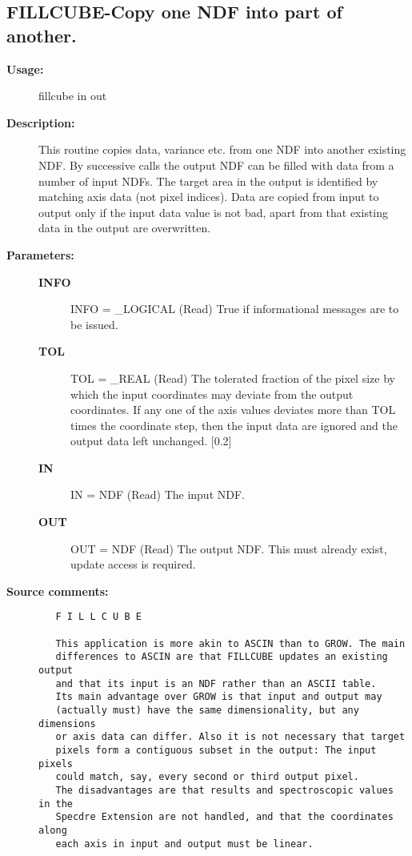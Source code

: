 \subsection{FILLCUBE-\label{FILLCUBE}Copy one NDF into part of another.}
\begin{description}

\item [{\bf Usage:}]

   fillcube in out


\item [{\bf Description:}]
   This routine copies data, variance etc. from one NDF into another
   existing NDF. By successive calls the output NDF can be filled
   with data from a number of input NDFs. The target area in the
   output is identified by matching axis data (not pixel indices).
   Data are copied from input to output only if the input data value
   is not bad, apart from that existing data in the output are
   overwritten.


\item [{\bf Parameters:}]
\begin{description}
\item [{\bf INFO}]
INFO = _LOGICAL (Read)
   True if informational messages are to be issued.
\item [{\bf TOL}]
TOL = _REAL (Read)
   The tolerated fraction of the pixel size by which the input
   coordinates may deviate from the output coordinates. If any one
   of the axis values deviates more than TOL times the coordinate
   step, then the input data are ignored and the output data left
   unchanged. [0.2]
\item [{\bf IN}]
IN = NDF (Read)
   The input NDF.
\item [{\bf OUT}]
OUT = NDF (Read)
   The output NDF. This must already exist, update access is
   required.

\end{description}

\item [{\bf Source comments:}]
\begin{verbatim}
   F I L L C U B E

   This application is more akin to ASCIN than to GROW. The main
   differences to ASCIN are that FILLCUBE updates an existing output
   and that its input is an NDF rather than an ASCII table.
   Its main advantage over GROW is that input and output may
   (actually must) have the same dimensionality, but any dimensions
   or axis data can differ. Also it is not necessary that target
   pixels form a contiguous subset in the output: The input pixels
   could match, say, every second or third output pixel.
   The disadvantages are that results and spectroscopic values in the
   Specdre Extension are not handled, and that the coordinates along
   each axis in input and output must be linear.


\end{verbatim}
\end{description}
